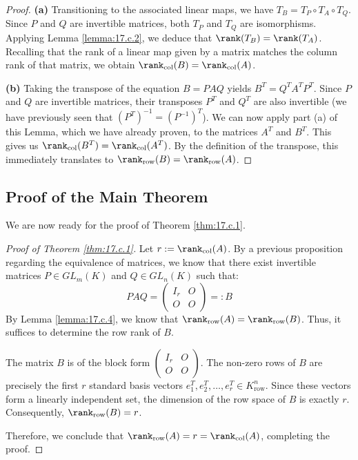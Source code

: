 \begin{proof}
\textbf{(a)} Transitioning to the associated linear maps, we have $T_B = T_P \circ T_A \circ T_Q$. Since $P$ and $Q$ are invertible matrices, both $T_P$ and $T_Q$ are isomorphisms. Applying Lemma \ref{lemma:17.c.2}, we deduce that $\rank(T_B) = \rank(T_A)$. Recalling that the rank of a linear map given by a matrix matches the column rank of that matrix, we obtain $\rank_{\text{col}}(B) = \rank_{\text{col}}(A)$.

\textbf{(b)} Taking the transpose of the equation $B = PAQ$ yields $B^T = Q^T A^T P^T$. Since $P$ and $Q$ are invertible matrices, their transposes $P^T$ and $Q^T$ are also invertible (we have previously seen that $(P^T)^{-1} = (P^{-1})^T$). We can now apply part (a) of this Lemma, which we have already proven, to the matrices $A^T$ and $B^T$. This gives us $\rank_{\text{col}}(B^T) = \rank_{\text{col}}(A^T)$. By the definition of the transpose, this immediately translates to $\rank_{\text{row}}(B) = \rank_{\text{row}}(A)$.
\end{proof}

\subsection{Proof of the Main Theorem}

We are now ready for the proof of Theorem \ref{thm:17.c.1}.

\begin{proof}[Proof of Theorem \ref{thm:17.c.1}]
Let $r := \rank_{\text{col}}(A)$. By a previous proposition regarding the equivalence of matrices, we know that there exist invertible matrices $P \in GL_m(K)$ and $Q \in GL_n(K)$ such that:
\begin{equation*}
    P A Q = \begin{pmatrix} I_r & O \\ O & O \end{pmatrix} =: B
\end{equation*}
By Lemma \ref{lemma:17.c.4}, we know that $\rank_{\text{row}}(A) = \rank_{\text{row}}(B)$. Thus, it suffices to determine the row rank of $B$.

The matrix $B$ is of the block form $\left(\begin{smallmatrix} I_r & O \\ O & O \end{smallmatrix}\right)$. The non-zero rows of $B$ are precisely the first $r$ standard basis vectors $e_1^T, e_2^T, \dots, e_r^T \in K_{\text{row}}^n$. Since these vectors form a linearly independent set, the dimension of the row space of $B$ is exactly $r$. Consequently, $\rank_{\text{row}}(B) = r$.

Therefore, we conclude that $\rank_{\text{row}}(A) = r = \rank_{\text{col}}(A)$, completing the proof.
\end{proof}